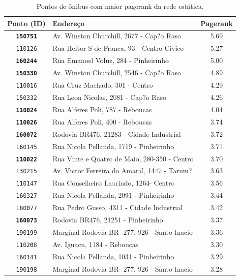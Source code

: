 \begin{table}[htb]
    \caption{Pontos de ônibus com maior pagerank da rede estática.}
    \label{tab:pagerank-rede-estatica}
    \centering
    \footnotesize
    \begin{tabular}{clc} 
        \hline
        Ponto (ID) & Endereço & Pagerank \\
        \hline
        \textbf{\texttt{150751}} &      Av. Winston Churchill, 2677 - Cap?o Raso &   5.69 \\
        \texttt{110126} &    Rua Heitor S de Franca, 93 - Centro Civico &   5.27 \\
        \textbf{\texttt{160244}} &          Rua Emanoel Voluz, 284 - Pinheirinho &   5.00 \\
        \textbf{\texttt{150330}} &      Av. Winston Churchill, 2546 - Cap?o Raso &   4.89 \\
        \texttt{110016} &                Rua Cruz Machado, 301 - Centro &   4.29 \\
        \texttt{150332} &           Rua Leon Nicolas, 2081 - Cap?o Raso &   4.26 \\
        \textbf{\texttt{110024}} &              Rua Alferes Poli, 787 - Reboucas &   4.04 \\
        \textbf{\texttt{110026}} &              Rua Alferes Poli, 400 - Reboucas &   3.74 \\
        \textbf{\texttt{160072}} &      Rodovia BR476, 21283 - Cidade Industrial &   3.72 \\
        \texttt{160145} &       Rua Nicola Pellanda, 1719 - Pinheirinho &   3.71 \\
        \textbf{\texttt{110022}}&  Rua Vinte e Quatro de Maio, 280-350 - Centro &   3.70 \\
        \texttt{130215} &  Av. Victor Ferreira do Amaral, 1447 - Tarum? &   3.63 \\
        \texttt{110147} &        Rua Conselheiro Laurindo, 1264- Centro &   3.56 \\
        \texttt{160327} &       Rua Nicola Pellanda, 2091 - Pinheirinho &   3.44 \\
        \texttt{180077} &     Rua Pedro Gusso, 4311 - Cidade Industrial &   3.42 \\
        \textbf{\texttt{160073}} &            Rodovia BR476, 21251 - Pinheirinho &   3.37 \\
        \texttt{190199} &  Marginal Rodovia BR- 277, 926 - Santo Inacio &   3.36 \\
        \texttt{110208} &                   Av. Iguacu, 1184 - Reboucas &   3.30 \\
        \texttt{160141} &       Rua Nicola Pellanda, 1031 - Pinheirinho &   3.29 \\
        \texttt{190198} &  Marginal Rodovia BR- 277, 926 - Santo Inacio &   3.28 \\
        \hline  
    \end{tabular}
\end{table}


